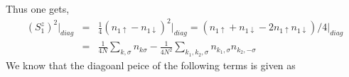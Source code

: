 \documentclass[reprint,prb,superscriptaddress]{revtex4-2}
\begin{document}
Thus one gets,
\begin{eqnarray}
(S_1^z)^2 \bigg|_{diag} &=& \frac{1}{4} (n_{1\uparrow}-n_{1\downarrow})^2\bigg|_{diag}=(n_{1\uparrow}+n_{1\downarrow}-2n_{1\uparrow}n_{1\downarrow})/4 \bigg|_{diag}\nonumber\\
&=& \frac{1}{4N} \displaystyle\sum_{k,\sigma} n_{k\sigma}-\frac{1}{4N^2} \displaystyle\sum_{k_1,k_2,\sigma} n_{k_1,\sigma} n_{k_2,-\sigma}
\end{eqnarray}
We know that the diagoanl peice of the following terms is given as
\end{document}
